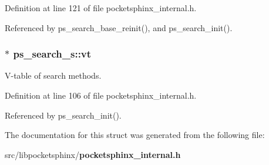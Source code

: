 Definition at line 121 of file pocketsphinx\-\_\-internal.\-h.



Referenced by ps\-\_\-search\-\_\-base\-\_\-reinit(), and ps\-\_\-search\-\_\-init().

\subsubsection[{vt}]{$\ast$ ps\-\_\-search\-\_\-s\-::vt}\label{structps__search__s_aa51e88956bbe9c05359d32526180809b}


V-\/table of search methods. 



Definition at line 106 of file pocketsphinx\-\_\-internal.\-h.



Referenced by ps\-\_\-search\-\_\-init().



The documentation for this struct was generated from the following file\-:\begin{DoxyCompactItemize}
\item 
src/libpocketsphinx/{\bf pocketsphinx\-\_\-internal.\-h}\end{DoxyCompactItemize}
